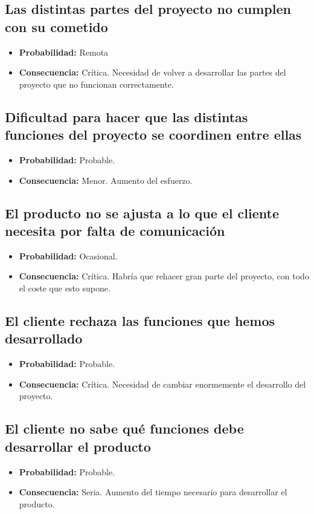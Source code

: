 \documentclass[spanish,a4paper,11pt, twoside]{report}	%
\begin{document}
	\subsection*{Las distintas partes del proyecto no cumplen con su cometido}
		\begin{itemize}
			\item \textbf {Probabilidad: }Remota
			\item \textbf {Consecuencia: }Crítica. Necesidad de volver a desarrollar las partes del proyecto que no funcionan correctamente.
		\end{itemize}
	
	\subsection*{Dificultad para hacer que las distintas funciones del proyecto se coordinen entre ellas}
		\begin{itemize}
			\item \textbf {Probabilidad: }Probable.
			\item \textbf {Consecuencia: }Menor. Aumento del esfuerzo.
		\end{itemize}
	
	\subsection*{El producto no se ajusta a lo que el cliente necesita por falta de comunicación}
		\begin{itemize}
			\item \textbf {Probabilidad: }Ocasional.
			\item \textbf {Consecuencia: }Crítica.  Habría que rehacer gran parte del proyecto, con todo el coste que esto supone.
		\end{itemize}
	
	\subsection*{El cliente rechaza las funciones que hemos desarrollado}
		\begin{itemize}
			\item \textbf {Probabilidad: }Probable.
			\item \textbf {Consecuencia: }Crítica. Necesidad de cambiar enormemente el desarrollo del proyecto.
		\end{itemize}
	
	\subsection*{El cliente no sabe qué funciones debe desarrollar el producto}
		\begin{itemize}
			\item \textbf {Probabilidad: }Probable.
			\item \textbf {Consecuencia: }Seria. Aumento del tiempo necesario para desarrollar el producto.
		\end{itemize}
	
\end{document}
